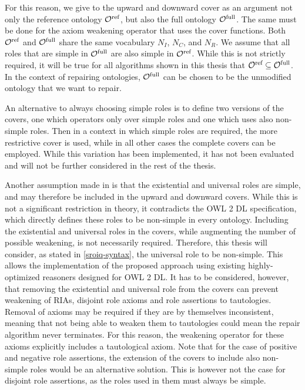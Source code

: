 For this reason, we give to the upward and downward cover as an argument not only the reference ontology ${\mathcal{O}^\textnormal{ref}}$, but also the full ontology ${\mathcal{O}^\textnormal{full}}$. The same must be done for the axiom weakening operator that uses the cover functions. Both ${\mathcal{O}^\textnormal{ref}}$ and ${\mathcal{O}^\textnormal{full}}$ share the same vocabulary $N_I$, $N_C$, and $N_R$. We assume that all roles that are simple in ${\mathcal{O}^\textnormal{full}}$ are also simple in ${\mathcal{O}^\textnormal{ref}}$. While this is not strictly required, it will be true for all algorithms shown in this thesis that ${\mathcal{O}^\textnormal{ref}} \subseteq {\mathcal{O}^\textnormal{full}}$. In the context of repairing ontologies, ${\mathcal{O}^\textnormal{full}}$ can be chosen to be the unmodified ontology that we want to repair.

An alternative to always choosing simple roles is to define two versions of the covers, one which operators only over simple roles and one which uses also non-simple roles. Then in a context in which simple roles are required, the more restrictive cover is used, while in all other cases the complete covers can be employed. While this variation has been implemented, it has not been evaluated and will not be further considered in the rest of the thesis.

Another assumption made in \cite{confalonieri2020towards} is that the existential and universal roles are simple, and may therefore be included in the upward and downward covers. While this is not a significant restriction in theory, it contradicts the OWL 2 DL specification, which directly defines these roles to be non-simple in every ontology. Including the existential and universal roles in the covers, while augmenting the number of possible weakening, is not necessarily required. Therefore, this thesis will consider, as stated in \cref{sroiq-syntax}, the universal role to be non-simple. This allows the implementation of the proposed approach using existing highly-optimized reasoners designed for OWL 2 DL. It has to be considered, however, that removing the existential and universal role from the covers can prevent weakening of RIAs, disjoint role axioms and role assertions to tautologies. Removal of axioms may be required if they are by themselves inconsistent, meaning that not being able to weaken them to tautologies could mean the repair algorithm never terminates. For this reason, the weakening operator for these axioms explicitly includes a tautological axiom. Note that for the case of positive and negative role assertions, the extension of the covers to include also non-simple roles would be an alternative solution. This is however not the case for disjoint role assertions, as the roles used in them must always be simple.

